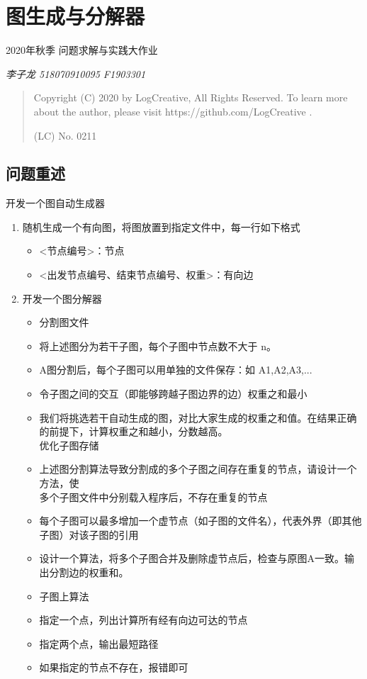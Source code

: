 \documentclass[
]{article}
\author{}
\date{}
\begin{document}
\hypertarget{header-n0}{%
\section{图生成与分解器}\label{header-n0}}

2020年秋季 问题求解与实践大作业

\emph{李子龙 518070910095 F1903301}

\begin{quote}
Copyright (C) 2020 by LogCreative, All Rights Reserved. To learn more
about the author, please visit https://github.com/LogCreative .

(LC) No. 0211
\end{quote}

\hypertarget{header-n7}{%
\subsection{问题重述}\label{header-n7}}

开发一个图自动生成器

\begin{enumerate}
\def\labelenumi{\arabic{enumi}.}
\item
  随机生成一个有向图，将图放置到指定文件中，每一行如下格式

  \begin{itemize}
  \item
    \textless 节点编号\textgreater：节点
  \item
    \textless 出发节点编号、结束节点编号、权重\textgreater：有向边
  \end{itemize}
\item
  开发一个图分解器

  \begin{itemize}
  \item
    分割图文件
  \item
    将上述图分为若干子图，每个子图中节点数不大于 n。
  \item
    A图分割后，每个子图可以用单独的文件保存：如 A1,A2,A3,...
  \item
    令子图之间的交互（即能够跨越子图边界的边）权重之和最小
  \item
    我们将挑选若干自动生成的图，对比大家生成的权重之和值。在结果正确的前提下，计算权重之和越小，分数越高。\\
    优化子图存储
  \item
    上述图分割算法导致分割成的多个子图之间存在重复的节点，请设计一个方法，使\\
    多个子图文件中分别载入程序后，不存在重复的节点
  \item
    每个子图可以最多增加一个虚节点（如子图的文件名），代表外界（即其他子图）对该子图的引用
  \item
    设计一个算法，将多个子图合并及删除虚节点后，检查与原图A一致。输出分割边的权重和。
  \item
    子图上算法
  \item
    指定一个点，列出计算所有经有向边可达的节点
  \item
    指定两个点，输出最短路径
  \item
    如果指定的节点不存在，报错即可
  \end{itemize}
\end{enumerate}
\end{document}

